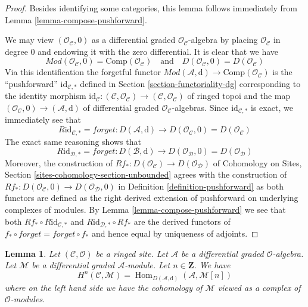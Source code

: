 \documentclass{stacks-project}
\theoremstyle{plain}
\newtheorem{lemma}[subsection]{Lemma}
\theoremstyle{definition}
\theoremstyle{remark}
\numberwithin{equation}{subsection}
\def\Hom{\mathop{\mathrm{Hom}}\nolimits}
\begin{document}
\begin{proof}
Besides identifying some categories, this lemma follows immediately
from Lemma \ref{lemma-compose-pushforward}.

\medskip\noindent
We may view $(\mathcal{O}_\mathcal{C}, 0)$ as a differential graded
$\mathcal{O}_\mathcal{C}$-algebra by placing $\mathcal{O}_\mathcal{C}$
in degree $0$ and endowing it with the zero differential. It is clear
that we have
$$
\textit{Mod}(\mathcal{O}_\mathcal{C}, 0) =
\text{Comp}(\mathcal{O}_\mathcal{C})
\quad\text{and}\quad
D(\mathcal{O}_\mathcal{C}, 0) = D(\mathcal{O}_\mathcal{C})
$$
Via this identification the forgetful functor
$\textit{Mod}(\mathcal{A}, \text{d}) \to
\text{Comp}(\mathcal{O}_\mathcal{C})$
is the ``pushforward'' $\text{id}_{\mathcal{C}, *}$
defined in Section \ref{section-functoriality-dg}
corresponding to the identity morphism
$\text{id}_\mathcal{C} : (\mathcal{C}, \mathcal{O}_\mathcal{C}) \to
(\mathcal{C}, \mathcal{O}_\mathcal{C})$ of ringed topoi and the
map $(\mathcal{O}_\mathcal{C}, 0) \to (\mathcal{A}, \text{d})$
of differential graded $\mathcal{O}_\mathcal{C}$-algebras.
Since $\text{id}_{\mathcal{C}, *}$ is exact, we immediately see that
$$
R\text{id}_{\mathcal{C}, *} = forget :
D(\mathcal{A}, \text{d}) \longrightarrow
D(\mathcal{O}_\mathcal{C}, 0) = D(\mathcal{O}_\mathcal{C})
$$
The exact same reasoning shows that
$$
R\text{id}_{\mathcal{D}, *} = forget :
D(\mathcal{B}, \text{d}) \longrightarrow
D(\mathcal{O}_\mathcal{D}, 0) = D(\mathcal{O}_\mathcal{D})
$$
Moreover, the construction of
$Rf_* : D(\mathcal{O}_\mathcal{C}) \to D(\mathcal{O}_\mathcal{D})$
of Cohomology on Sites, Section \ref{sites-cohomology-section-unbounded}
agrees with the construction of
$Rf_* : D(\mathcal{O}_\mathcal{C}, 0) \to D(\mathcal{O}_\mathcal{D}, 0)$
in Definition \ref{definition-pushforward}
as both functors are defined as the right derived extension of
pushforward on underlying complexes of modules.
By Lemma \ref{lemma-compose-pushforward} we see that both
$Rf_* \circ R\text{id}_{\mathcal{C}, *}$ and
$R\text{id}_{\mathcal{D}, *} \circ Rf_*$ are the derived functors
of $f_* \circ forget = forget \circ f_*$ and hence equal
by uniqueness of adjoints.
\end{proof}

\begin{lemma}
\label{lemma-cohomology-ext}
Let $(\mathcal{C}, \mathcal{O})$ be a ringed site.
Let $\mathcal{A}$ be a differential graded $\mathcal{O}$-algebra.
Let $\mathcal{M}$ be a differential graded $\mathcal{A}$-module.
Let $n \in \mathbf{Z}$. We have
$$
H^n(\mathcal{C}, \mathcal{M}) =
\Hom_{D(\mathcal{A}, \text{d})}(\mathcal{A}, \mathcal{M}[n])
$$
where on the left hand side we have the cohomology of $\mathcal{M}$
viewed as a complex of $\mathcal{O}$-modules.
\end{lemma}
\end{document}
